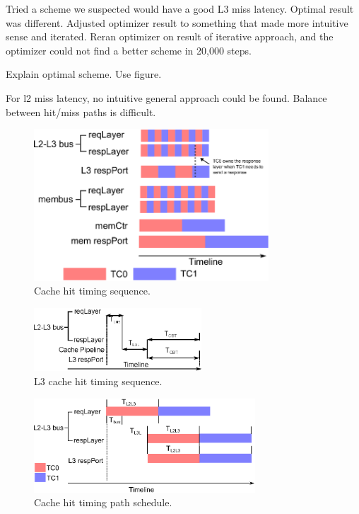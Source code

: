 Tried a scheme we suspected would have a good L3 miss latency. Optimal result 
was different. Adjusted optimizer result to something that made more intuitive 
sense and iterated. Reran optimizer on result of iterative approach, and the 
optimizer could not find a better scheme in 20,000 steps.

Explain optimal scheme. Use figure.

For l2 miss latency, no intuitive general approach could be found. Balance 
between hit/miss paths is difficult.


\begin{figure}
    \begin{center}
        \includegraphics[width=3.46in]{figs/baseline_schedule.eps}
        \caption{Cache hit timing sequence.}
        \label{fig:naive_scheme}
    \end{center}
\end{figure}


\begin{figure}
    \begin{center}
        \includegraphics[width=2.4675in]{figs/hit_timing.eps}
        \caption{L3 cache hit timing sequence.}
        \label{fig:hit_timing}
    \end{center}
\end{figure}

\begin{figure}
    \begin{center}
        \includegraphics[width=3.2624in]{figs/hit_schedule.eps}
        \caption{Cache hit timing path schedule.}
        \label{fig:hit_schedule}
    \end{center}
\end{figure}

